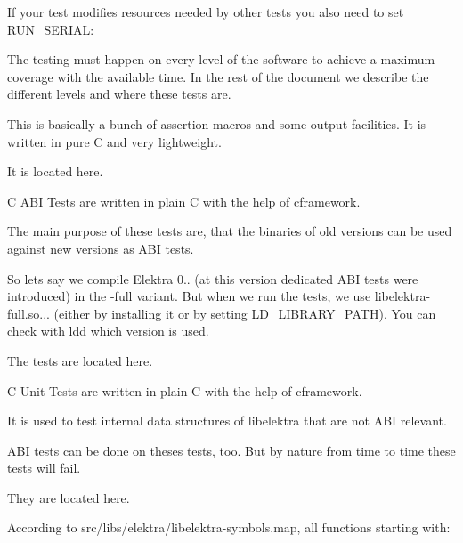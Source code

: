 \begin{DoxyCode}{0}
\end{DoxyCode}



\begin{DoxyItemize}
\item If your test modifies resources needed by other tests you also need to set {\ttfamily R\+U\+N\+\_\+\+S\+E\+R\+I\+AL}\+:
\end{DoxyItemize}


\begin{DoxyCode}{0}
\end{DoxyCode}


The testing must happen on every level of the software to achieve a maximum coverage with the available time. In the rest of the document we describe the different levels and where these tests are.

This is basically a bunch of assertion macros and some output facilities. It is written in pure C and very lightweight.

It is located here.

C A\+BI Tests are written in plain C with the help of {\ttfamily cframework}.

The main purpose of these tests are, that the binaries of old versions can be used against new versions as A\+BI tests.

So lets say we compile Elektra 0.. (at this version dedicated A\+BI tests were introduced) in the {\ttfamily -\/full} variant. But when we run the tests, we use {\ttfamily libelektra-\/full.\+so...} (either by installing it or by setting {\ttfamily L\+D\+\_\+\+L\+I\+B\+R\+A\+R\+Y\+\_\+\+P\+A\+TH}). You can check with {\ttfamily ldd} which version is used.

The tests are located here.

C Unit Tests are written in plain C with the help of {\ttfamily cframework}.

It is used to test internal data structures of libelektra that are not A\+BI relevant.

A\+BI tests can be done on theses tests, too. But by nature from time to time these tests will fail.

They are located here.

According to {\ttfamily src/libs/elektra/libelektra-\/symbols.\+map}, all functions starting with\+:


